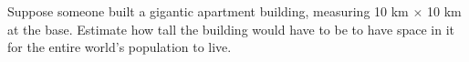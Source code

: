 Suppose someone built a gigantic apartment building,
measuring 10 km $\times$ 10 km at the base. Estimate how tall the
building would have to be to have space in it for the entire
world's population to live.
